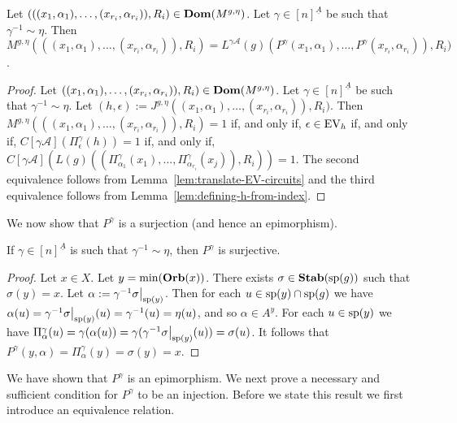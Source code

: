 \documentclass[../main/thesis.tex]{subfiles}
\begin{document}
\begin{prop}
  Let $(((x_1, \alpha_1), \ldots, (x_{r_i}, \alpha_{r_i})), R_i) \in \text{\textbf{Dom}} (M^{g,
    \eta})$. Let $\gamma \in [n]^{\underline{A}}$ be such that $ \gamma^{-1}
  \sim \eta$. Then $M^{g, \eta}(((x_1, \alpha_1), \ldots, (x_{r_i},
  \alpha_{r_i})), R_i) = L^{\gamma\mathcal{A}}(g)(P^{\gamma}(x_1, \alpha_1),
  \ldots, P^{\gamma}(x_{r_i}, \alpha_{r_i})), R_i)$.
	\label{prop:M-to-L-homomorphism}
\end{prop}
\begin{proof}
  Let $((x_1, \alpha_1), \ldots, (x_{r_i}, \alpha_{r_i})), R_i) \in \text{\textbf{Dom}} (M^{g,
    \eta})$. Let $\gamma \in [n]^{\underline{A}}$ be such that $ \gamma^{-1}
  \sim \eta$. Let $(h, \epsilon) := J^{g, \eta}((x_1, \alpha_1), \ldots,
  (x_{r_i}, \alpha_{r_i})), R_i)$. Then $M^{g, \eta}(((x_1, \alpha_1), \ldots,
  (x_{r_i}, \alpha_{r_i})), R_i) = 1$ if, and only if, $\epsilon \in \text{EV}_h$ if,
  and only if, $C[\gamma \mathcal{A}] (\Pi^{\gamma}_{\epsilon}(h)) = 1$ if, and
  only if, $C[\gamma \mathcal{A}] (L(g)((\Pi^{\gamma}_{\alpha_1} (x_1), \ldots,
  \Pi^{\gamma}_{\alpha_{r_i}}(x_j)), R_i)) = 1$. The second equivalence follows
  from Lemma~\ref{lem:translate-EV-circuits} and the third equivalence follows
  from Lemma~\ref{lem:defining-h-from-index}.
\end{proof}

We now show that $P^{\gamma}$ is a surjection (and hence an epimorphism).

\begin{lem} 
	If $\gamma \in [n]^{\underline{A}}$ is such that $\gamma^{-1} \sim \eta$, then
  $P^{\gamma}$ is surjective.
  \label{lem:M-to-L-surjective}
\end{lem}
\begin{proof}
  Let $x \in X$. Let $y = \min(\text{\textbf{Orb}}(x))$. There exists $\sigma \in \text{\textbf{Stab}} (\text{sp} (g))$
  such that $\sigma (y) = x$. Let $\alpha := \gamma^{-1}
  \restr{\sigma}{\consp(y)}$. Then for each $u \in \text{sp}(y) \cap \text{sp}(g)$ we
  have $\alpha(u) = \gamma^{-1} \restr{\sigma}{\consp(y)} (u) = \gamma^{-1}(u) =
  \eta (u)$, and so $\alpha \in A^y$. For each $u \in \text{sp}(y)$ we have
  $\Pi^{\gamma}_\alpha(u) = \gamma (\alpha(u)) = \gamma(\gamma^{-1}
  \restr{\sigma}{\consp(y)}(u)) = \sigma (u)$. It follows that $P^{\gamma}(y,
  \alpha) = \Pi^{\gamma}_\alpha(y) = \sigma (y) = x$.
\end{proof}

We have shown that $P^{\gamma}$ is an epimorphism. We next prove a necessary and
sufficient condition for $P^{\gamma}$ to be an injection. Before we state this
result we first introduce an equivalence relation.
\end{document}
